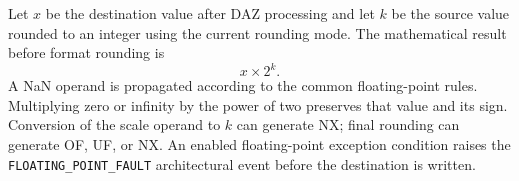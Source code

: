Let \(x\) be the destination value after DAZ processing and let \(k\) be the source value rounded to an integer using the current rounding mode. The mathematical result before format rounding is
\[
  x \times 2^k .
\]
A NaN operand is propagated according to the common floating-point rules. Multiplying zero or infinity by the power of two preserves that value and its sign. Conversion of the scale operand to \(k\) can generate NX; final rounding can generate OF, UF, or NX. An enabled floating-point exception condition raises the \texttt{FLOATING\_POINT\_FAULT} architectural event before the destination is written.
